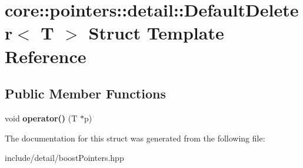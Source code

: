 \hypertarget{structcore_1_1pointers_1_1detail_1_1_default_deleter}{\section{core\-:\-:pointers\-:\-:detail\-:\-:Default\-Deleter$<$ T $>$ Struct Template Reference}
\label{structcore_1_1pointers_1_1detail_1_1_default_deleter}
}
\subsection*{Public Member Functions}
\begin{DoxyCompactItemize}
\item 
\hypertarget{structcore_1_1pointers_1_1detail_1_1_default_deleter_a872a20258c2e43650e9d912eca8bace0}{void {\bfseries operator()} (T $\ast$p)}\label{structcore_1_1pointers_1_1detail_1_1_default_deleter_a872a20258c2e43650e9d912eca8bace0}

\end{DoxyCompactItemize}


The documentation for this struct was generated from the following file\-:\begin{DoxyCompactItemize}
\item 
include/detail/boost\-Pointers.\-hpp\end{DoxyCompactItemize}
